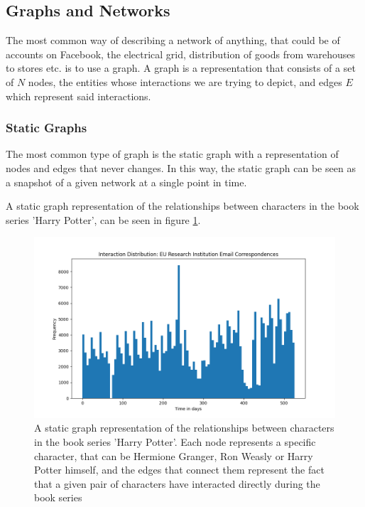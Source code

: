 \subsection{Graphs and Networks}
\label{sec:Method:Graphs}
The most common way of describing a network of anything, that could be of accounts on Facebook, the electrical grid, distribution of goods from warehouses to stores etc. is to use a graph.
A graph is a representation that consists of a set of $N$ nodes, the entities whose interactions we are trying to depict, and edges $E$ which represent said interactions.


\subsubsection{Static Graphs}
\label{sec:Method:Graphs:StaticGraphs}
The most common type of graph is the static graph with a representation of nodes and edges that never changes. 
In this way, the static graph can be seen as a snapshot of a given network at a single point in time.

A static graph representation of the relationships between characters in the book series 'Harry Potter', can be seen in figure \ref{fig:StaticGraph}.

\begin{figure}[H]
    \centering
    \includegraphics[width=\textwidth]{0_images/reallife_dataset_2_dist.png}
    \caption{A static graph representation of the relationships between characters in the book series 'Harry Potter'. Each node represents a specific character, that can be Hermione Granger, Ron Weasly or Harry Potter himself, and the edges that connect them represent the fact that a given pair of characters have interacted directly during the book series}
    \label{fig:StaticGraph}
\end{figure}



